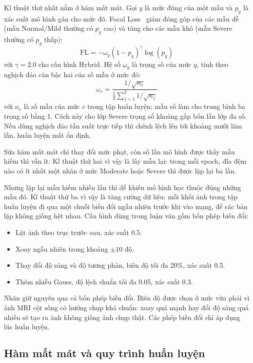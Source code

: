 Kĩ thuật thứ nhất nằm ở hàm mất mát. Gọi $y$ là mức đúng của một mẫu và $p_y$ là xác suất mô hình gán cho mức đó. Focal Loss~\cite{lin2017focal} giảm đóng góp của các mẫu dễ (mẫu Normal/Mild thường có $p_y$ cao) và tăng cho các mẫu khó (mẫu Severe thường có $p_y$ thấp):
\begin{equation}
    \text{FL} = -\omega_y (1 - p_y)^\gamma \log(p_y)
    \label{eq:focal}
\end{equation}
với $\gamma = 2.0$ cho cấu hình Hybrid. Hệ số $\omega_y$ là trọng số của mức $y$, tính theo nghịch đảo căn bậc hai của số mẫu ở mức đó:
\begin{equation}
    \omega_c = \frac{1/\sqrt{n_c}}{\frac{1}{3}\sum_{j=1}^{3} 1/\sqrt{n_j}}
    \label{eq:sqrt_weight}
\end{equation}
với $n_c$ là số mẫu của mức $c$ trong tập huấn luyện; mẫu số làm cho trung bình ba trọng số bằng 1. Cách này cho lớp Severe trọng số khoảng gấp bốn lần lớp đa số. Nếu dùng nghịch đảo tần suất trực tiếp thì chênh lệch lên tới khoảng mười lăm lần, huấn luyện mất ổn định.

Sửa hàm mất mát chỉ thay đổi mức phạt, còn số lần mô hình được thấy mẫu hiếm thì vẫn ít. Kĩ thuật thứ hai vì vậy là lấy mẫu lại: trong mỗi epoch, đĩa đệm nào có ít nhất một nhãn ở mức Moderate hoặc Severe thì được lặp lại ba lần.

Nhưng lặp lại mẫu hiếm nhiều lần thì dễ khiến mô hình học thuộc đúng những mẫu đó. Kĩ thuật thứ ba vì vậy là tăng cường dữ liệu: mỗi khối ảnh trong tập huấn luyện đi qua một chuỗi biến đổi ngẫu nhiên trước khi vào mạng, để các bản lặp không giống hệt nhau. Cấu hình dùng trong luận văn gồm bốn phép biến đổi:

\begin{itemize}
    \item Lật ảnh theo trục trước--sau, xác suất 0.5.
    \item Xoay ngẫu nhiên trong khoảng $\pm 10$ độ.
    \item Thay đổi độ sáng và độ tương phản, biên độ tối đa 20\%, xác suất 0.5.
    \item Thêm nhiễu Gauss, độ lệch chuẩn tối đa 0.05, xác suất 0.3.
\end{itemize}

Nhãn giữ nguyên qua cả bốn phép biến đổi. Biên độ được chọn ở mức vừa phải vì ảnh MRI cột sống có hướng chụp khá chuẩn: xoay quá mạnh hay đổi độ sáng quá nhiều sẽ tạo ra ảnh không giống ảnh chụp thật. Các phép biến đổi chỉ áp dụng lúc huấn luyện.

\subsection{Hàm mất mát và quy trình huấn luyện}
\label{subsec:training_procedure}


